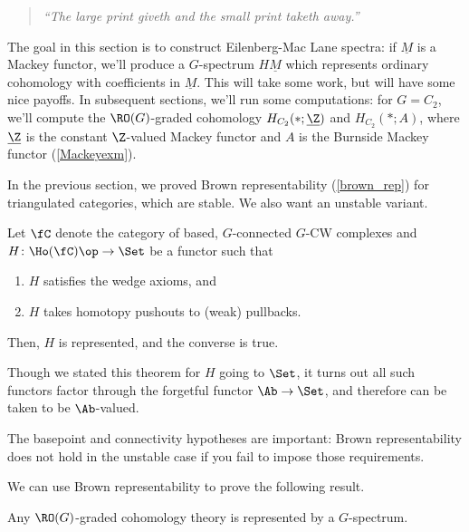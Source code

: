 \begin{quote}\textit{
	``The large print giveth and the small print taketh away.''
}\end{quote}
The goal in this section is to construct Eilenberg-Mac Lane spectra:
if $\underline M$ is a Mackey functor, we'll produce a $G$-spectrum $H\underline M$ which
represents ordinary cohomology with coefficients in $\underline M$.  This will take some work, but will have some
nice payoffs. In subsequent sections, we'll run some computations: for $G = C_2$, we'll compute the $\RO(G)$-graded
cohomology $H_{C_2}(*;\underline\Z)$ and $H_{C_2}(*;A)$, where $\underline\Z$ is the constant $\Z$-valued Mackey
functor and $A$ is the Burnside Mackey functor (\cref{Mackeyexm}).

In the previous section, we proved Brown representability (\cref{brown_rep}) for triangulated categories, which are
stable. We also want an unstable variant.
\begin{thm}
Let $\fC$ denote the category of based, $G$-connected $G$-CW complexes and $H\colon \Ho(\fC)\op\to\Set$ be a
functor such that
\begin{enumerate}
	\item $H$ satisfies the wedge axioms, and
	\item $H$ takes homotopy pushouts to (weak) pullbacks.
\end{enumerate}
Then, $H$ is represented, and the converse is true.
\end{thm}
Though we stated this theorem for $H$ going to $\Set$, it turns out all such functors factor through the forgetful
functor $\Ab\to\Set$, and therefore can be taken to be $\Ab$-valued.
\begin{warn}
The basepoint and connectivity hypotheses are important: Brown representability does not hold in the unstable case
if you fail to impose those requirements.
\end{warn}
We can use Brown representability to prove the following result.
\begin{prop}
Any $\RO(G)$-graded cohomology theory is represented by a $G$-spectrum.
\end{prop}
